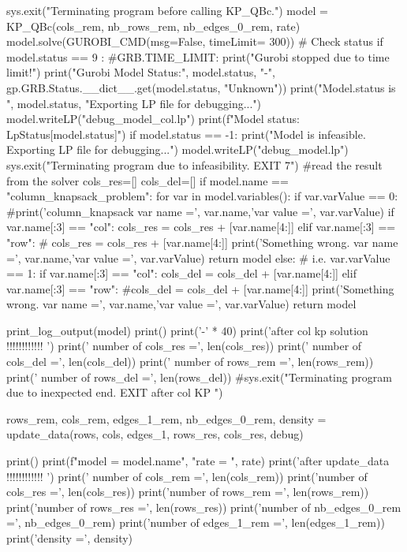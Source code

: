     
    sys.exit("Terminating program  before calling KP_QBc.")
    model = KP_QBc(cols_rem, nb_rows_rem, nb_edges_0_rem, rate)
    model.solve(GUROBI_CMD(msg=False, timeLimit= 300))
    # Check status
    if model.status == 9 : #GRB.TIME_LIMIT:
        print("Gurobi stopped due to time limit!")
    print("Gurobi Model Status:", model.status, "-", gp.GRB.Status.__dict__.get(model.status, "Unknown"))
    print("Model.status is ", model.status, "Exporting LP file for debugging...")
    model.writeLP("debug_model_col.lp")
    print(f"Model status: {LpStatus[model.status]}")
    if model.status == -1:
         print("Model is infeasible. Exporting LP file for debugging...")
         model.writeLP("debug_model.lp")
         sys.exit("Terminating program due to infeasibility. EXIT 7")
    #read the result from the solver
    cols_res=[]
    cols_del=[]
    if model.name == "column_knapsack_problem":
            for var in model.variables():
                if var.varValue == 0:
                    #print('column_knapsack var name =', var.name,'var value =', var.varValue)
                    if var.name[:3] == "col":
                        cols_res = cols_res + [var.name[4:]]
                    elif var.name[:3] == "row":
                #    cols_res = cols_res + [var.name[4:]]
                        print('Something wrong. var name =', var.name,'var value =', var.varValue)
                        return model 
                else: # i.e. var.varValue == 1:
                    if var.name[:3] == "col":
                        cols_del = cols_del + [var.name[4:]]
                    elif var.name[:3] == "row":
                        #cols_del = cols_del + [var.name[4:]]
                        print('Something wrong. var name =', var.name,'var value =', var.varValue)
                        return model 
                    
    print_log_output(model) 
    print()
    print('-' * 40)           
    print('after col kp solution !!!!!!!!!!!! ')
    print(' number of cols_res =', len(cols_res))
    print(' number of  cols_del =', len(cols_del)) 
    print(' number of  rows_rem =', len(rows_rem))
    print(' number of rows_del =', len(rows_del))
    #sys.exit("Terminating program due to inexpected end. EXIT after col KP ")

    rows_rem, cols_rem, edges_1_rem, nb_edges_0_rem, density = update_data(rows, cols, edges_1, rows_res, cols_res, debug) 

    print()
    print(f"model = {model.name}", "rate =  ", rate)
    print('after update_data !!!!!!!!!!!! ')
    print(' number of cols_rem =', len(cols_rem))
    print('number of cols_res =', len(cols_res))
    print('number of rows_rem =', len(rows_rem))
    print('number of rows_res =', len(rows_res)) 
    print('number of nb_edges_0_rem =', nb_edges_0_rem)
    print('number of edges_1_rem =', len(edges_1_rem))
    print('density =', density) 



